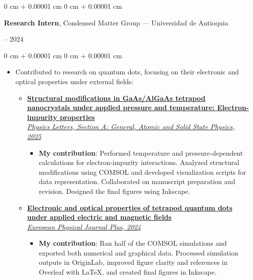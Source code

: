 \documentclass[10pt, letterpaper]{article}
\newenvironment{highlights}{
    \begin{itemize}[
        topsep=0.10 cm,
        parsep=0.10 cm,
        partopsep=0pt,
        itemsep=0pt,
        leftmargin=0 cm + 10pt
    ]
}{
    \end{itemize}
}
\newenvironment{onecolentry}{
    \begin{adjustwidth}{
        0 cm + 0.00001 cm
    }{
        0 cm + 0.00001 cm
    }
}{
    \end{adjustwidth}
}
\newenvironment{twocolentry}[2][]{
    \onecolentry
    \def\secondColumn{#2}
    \setcolumnwidth{\fill, 4.5 cm}
    \begin{paracol}{2}
}{
    \switchcolumn \raggedleft \secondColumn
    \end{paracol}
    \endonecolentry
}
\begin{document}
    \vspace{0.2 cm}
    \begin{twocolentry}{
        2023 – 2024
    }
        \textbf{Research Intern}, Condensed Matter Group --- Universidad de Antioquia
    \end{twocolentry}

    \vspace{0.10 cm}
    \begin{onecolentry}
        \begin{highlights}
            \item Contributed to research on quantum dots, focusing on their electronic and optical properties under external fields:
            \begin{itemize}

                \item \href{https://doi.org/10.1016/j.physleta.2025.130897}{\textbf{Structural modifications in GaAs/AlGaAs tetrapod nanocrystals under applied pressure and temperature: Electron-impurity properties} \\ \textit{Physics Letters, Section A: General, Atomic and Solid State Physics, 2025}}
                \begin{itemize}
                    \item \textbf{My contribution}: Performed temperature and pressure-dependent calculations for electron-impurity interactions. Analyzed structural modifications using COMSOL and developed visualization scripts for data representation. Collaborated on manuscript preparation and revision. Designed the final figures using Inkscape.
                \end{itemize}

                \item \href{https://doi.org/10.1140/epjp/s13360-024-05089-z}{\textbf{Electronic and optical properties of tetrapod quantum dots under applied electric and magnetic fields} \\ \textit{European Physical Journal Plus, 2024}}
                \begin{itemize}
                    \item \textbf{My contribution}: Ran half of the COMSOL simulations and exported both numerical and graphical data. Processed simulation outputs in OriginLab, improved figure clarity and references in Overleaf with \LaTeX, and created final figures in Inkscape.
                \end{itemize}


\end{itemize}
\end{highlights}
\end{onecolentry}
\end{document}
